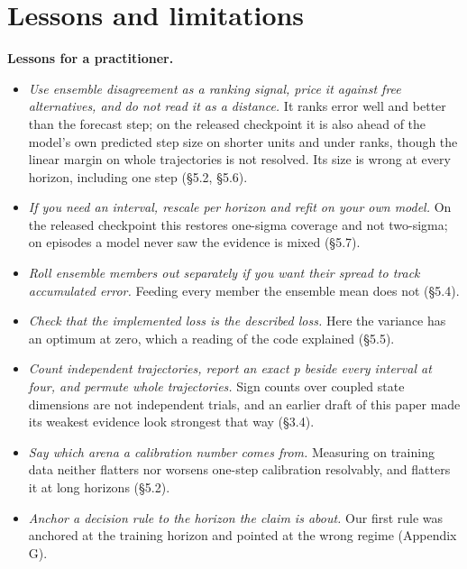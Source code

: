 \documentclass[10pt]{article}
\begin{document}
\section{Lessons and limitations}

\textbf{Lessons for a practitioner.}
\begin{itemize}
\item \emph{Use ensemble disagreement as a ranking signal, price it against free alternatives, and do not read it as a distance.} It ranks error well and better than the forecast step; on the released checkpoint it is also ahead of the model's own predicted step size on shorter units and under ranks, though the linear margin on whole trajectories is not resolved. Its size is wrong at every horizon, including one step (\S{}5.2, \S{}5.6).
\item \emph{If you need an interval, rescale per horizon and refit on your own model.} On the released checkpoint this restores one-sigma coverage and not two-sigma; on episodes a model never saw the evidence is mixed (\S{}5.7).
\item \emph{Roll ensemble members out separately if you want their spread to track accumulated error.} Feeding every member the ensemble mean does not (\S{}5.4).
\item \emph{Check that the implemented loss is the described loss.} Here the variance has an optimum at zero, which a reading of the code explained (\S{}5.5).
\item \emph{Count independent trajectories, report an exact p beside every interval at four, and permute whole trajectories.} Sign counts over coupled state dimensions are not independent trials, and an earlier draft of this paper made its weakest evidence look strongest that way (\S{}3.4).
\item \emph{Say which arena a calibration number comes from.} Measuring on training data neither flatters nor worsens one-step calibration resolvably, and flatters it at long horizons (\S{}5.2).
\item \emph{Anchor a decision rule to the horizon the claim is about.} Our first rule was anchored at the training horizon and pointed at the wrong regime (Appendix G).
\end{itemize}
\end{document}
